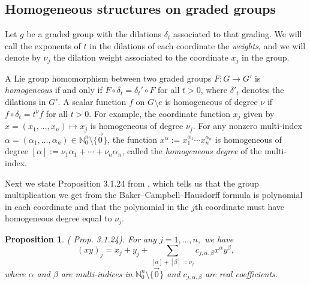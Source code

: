 \documentclass{article}
\newtheorem{prop}[theorem]{Proposition}
\theoremstyle{definition}
\newcommand{\HR}{H(\mathbb{R})}
\newcommand{\N}{{\mathbb N}}
\begin{document}
\subsection{Homogeneous structures on graded groups}

Let $g$ be a graded group with the dilations $\delta_t$ associated to that grading. We will call the exponents of $t$ in the dilations of each coordinate the {\em weights}, and we will denote by $\nu_j$ the dilation weight associated to the coordinate $x_j$ in the group.


A Lie group homomorphism between two graded groups $F:G\to G'$ is {\em homogeneous} if and only if $F\circ\delta_t = \delta_t'\circ F$ for all $t>0$, where $\delta'_t$ denotes the dilations in $G'$. A scalar function $f$ on $G\setminus {e}$ is homogeneous of degree $\nu$ if $f\circ \delta_t = t^\nu f$ for all $t>0$. For example, the coordinate function $x_j$ given by
$x = (x_1, \ldots, x_n) \mapsto x_j$ 
is homogeneous of degree $\nu_j$. For any nonzero multi-index $\alpha = (\alpha_1, \ldots, \alpha_n) \in \N_0^n\setminus \{\vec 0\}$, the function $x^\alpha := x_1^{\alpha_1}\cdots x_n^{\alpha_n}$ is homogeneous of degree $[\alpha]:= \nu_1\alpha_1 + \cdots + \nu_n\alpha_n$, called the {\em homogeneous degree} of the multi-index.


Next we state Proposition 3.1.24 from \cite{fischer-ruzhansky}, which tells us that the group multiplication we get from the Baker--Campbell--Hausdorff formula is polynomial in each coordinate and that the polynomial in the $j$th coordinate must have homogeneous degree equal to $\nu_j$.
\begin{prop}\label{prop:polynomials} (\cite{fischer-ruzhansky} Prop. 3.1.24).
For any $j = 1, \ldots, n,$ we have
\[
(xy)_j = x_j + y_j + \sum_{[\alpha] + [\beta] = \nu_j} c_{j,\alpha,\beta}x^\alpha y^\beta,
\]
where $\alpha$ and $\beta$ are multi-indices in $\N_0^n\setminus\{\vec 0\}$ and $c_{j, \alpha, \beta}$ are real coefficients.
\end{prop}
\end{document}
